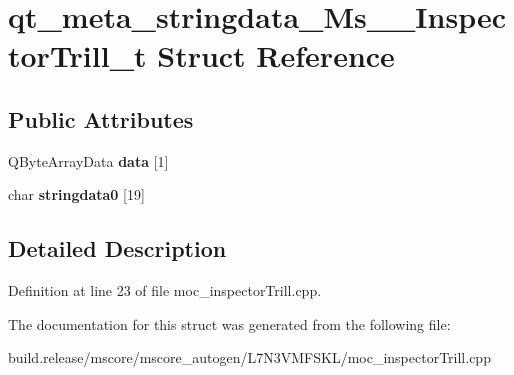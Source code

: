 \hypertarget{structqt__meta__stringdata___ms_____inspector_trill__t}{}\section{qt\+\_\+meta\+\_\+stringdata\+\_\+\+Ms\+\_\+\+\_\+\+Inspector\+Trill\+\_\+t Struct Reference}
\label{structqt__meta__stringdata___ms_____inspector_trill__t}
\subsection*{Public Attributes}
\begin{DoxyCompactItemize}
\item 
\mbox{\label{structqt__meta__stringdata___ms_____inspector_trill__t_a9bea13402734a2bba1867878affdee26}} 
Q\+Byte\+Array\+Data {\bfseries data} \mbox{[}1\mbox{]}
\item 
\mbox{\label{structqt__meta__stringdata___ms_____inspector_trill__t_a95e17f8d5f2d056df5aa901f9a7c3f01}} 
char {\bfseries stringdata0} \mbox{[}19\mbox{]}
\end{DoxyCompactItemize}


\subsection{Detailed Description}


Definition at line 23 of file moc\+\_\+inspector\+Trill.\+cpp.



The documentation for this struct was generated from the following file\+:\begin{DoxyCompactItemize}
\item 
build.\+release/mscore/mscore\+\_\+autogen/\+L7\+N3\+V\+M\+F\+S\+K\+L/moc\+\_\+inspector\+Trill.\+cpp\end{DoxyCompactItemize}
